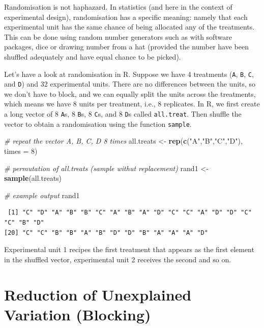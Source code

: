 \documentclass[
  letterpaper,
]{book}
\newenvironment{Shaded}{\begin{snugshade}}{\end{snugshade}}
\newcommand{\AttributeTok}[1]{\textcolor[rgb]{0.13,0.29,0.53}{#1}}
\newcommand{\CommentTok}[1]{\textcolor[rgb]{0.56,0.35,0.01}{\textit{#1}}}
\newcommand{\DecValTok}[1]{\textcolor[rgb]{0.00,0.00,0.81}{#1}}
\newcommand{\FunctionTok}[1]{\textcolor[rgb]{0.13,0.29,0.53}{\textbf{#1}}}
\newcommand{\NormalTok}[1]{#1}
\newcommand{\OtherTok}[1]{\textcolor[rgb]{0.56,0.35,0.01}{#1}}
\newcommand{\StringTok}[1]{\textcolor[rgb]{0.31,0.60,0.02}{#1}}
\begin{document}
Randomisation is not haphazard. In statistics (and here in the context
of experimental design), randomisation has a specific meaning: namely
that each experimental unit has the same chance of being allocated any
of the treatments. This can be done using random number generators such
as with software packages, dice or drawing number from a hat (provided
the number have been shuffled adequately and have equal chance to be
picked).

Let's have a look at randomisation in R. Suppose we have 4 treatments
(\texttt{A}, \texttt{B}, \texttt{C}, and \texttt{D}) and 32 experimental
units. There are no differences between the units, so we don't have to
block, and we can equally split the units across the treatments, which
means we have 8 units per treatment, i.e., 8 replicates. In R, we first
create a long vector of 8 \texttt{A}s, 8 \texttt{B}s, 8 \texttt{C}s, and
8 \texttt{D}s called \texttt{all.treat}. Then shuffle the vector to
obtain a randomisation using the function \texttt{sample}.

\begin{Shaded}
\begin{Highlighting}[]
\CommentTok{\# repeat the vector A, B, C, D 8 times }
\NormalTok{all.treats }\OtherTok{\textless{}{-}} \FunctionTok{rep}\NormalTok{(}\FunctionTok{c}\NormalTok{(}\StringTok{"A"}\NormalTok{,}\StringTok{"B"}\NormalTok{,}\StringTok{"C"}\NormalTok{,}\StringTok{"D"}\NormalTok{), }\AttributeTok{times =} \DecValTok{8}\NormalTok{)}

\CommentTok{\# permutation of all.treats (sample withut replacement)}
\NormalTok{rand1 }\OtherTok{\textless{}{-}} \FunctionTok{sample}\NormalTok{(all.treats)}

\CommentTok{\# example output}
\NormalTok{rand1}
\end{Highlighting}
\end{Shaded}

\begin{verbatim}
 [1] "C" "D" "A" "B" "B" "C" "A" "B" "A" "D" "C" "C" "A" "D" "D" "C" "C" "B" "D"
[20] "C" "C" "B" "B" "A" "B" "D" "D" "B" "A" "A" "A" "D"
\end{verbatim}

Experimental unit 1 recipes the first treatment that appears as the
first element in the shuffled vector, experimental unit 2 receives the
second and so on.

\section*{Reduction of Unexplained Variation
(Blocking)}\label{reduction-of-unexplained-variation-blocking}
\end{document}
